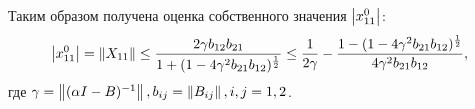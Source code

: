 Таким образом получена оценка собственного значения $\left|x_{11}^0\right|$:
$$
	\left|x_{11}^0\right| = \left\|X_{11}\right\| \leq \frac{2\gamma b_{12}b_{21}}{1 + (1 - 4\gamma^2 b_{21}b_{12})^{\frac{1}{2}}} \leq \frac{1}{2\gamma} - \frac{1 - (1 - 4\gamma^2 b_{21}b_{12})^{\frac{1}{2}}}{4\gamma^2 b_{21}b_{12}},
$$
где $\gamma = \left\|(\alpha I - B)^{-1}\right\|, b_{ij} = \left\|B_{ij}\right\|, i,j=1,2$.